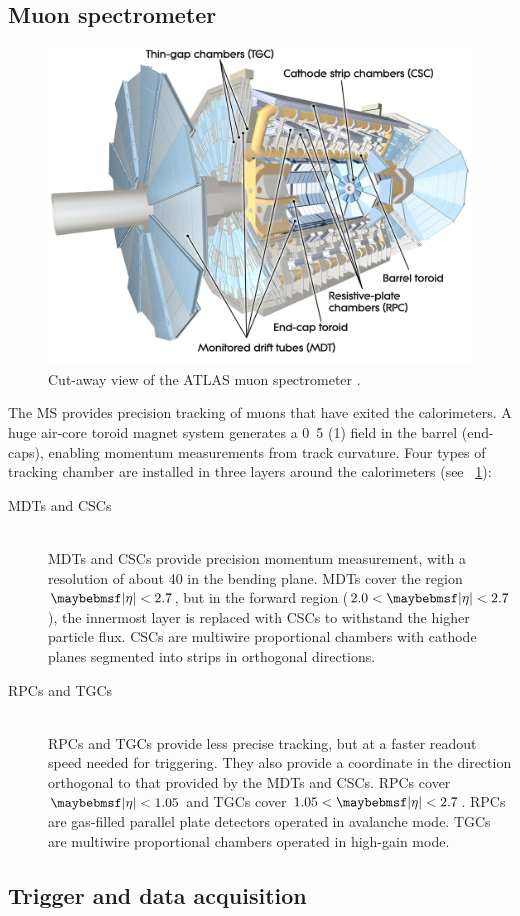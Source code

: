 \subsection{Muon spectrometer}

\begin{figure}
	\includegraphics[width=\mediumfigwidth]{tex/experiment/ms_whole}
	\caption{Cut-away view of the ATLAS muon spectrometer \cite{ATLAS-detector}.}
	\label{fig:muon_spectrometer}
\end{figure}

The \ac{MS} provides precision tracking of muons that have exited the calorimeters. A 
huge air-core toroid magnet system generates a \unit{0.5}{\tesla} (\unit{1}{\tesla}) 
field in the barrel (end-caps), enabling momentum measurements from track curvature. Four 
types of tracking chamber are installed in three layers around the calorimeters (see 
\Figure~\ref{fig:muon_spectrometer}):
\begin{description}
\item[\acp{MDT} and \acp{CSC}] \hfill \\
	\acp{MDT} and \acp{CSC} provide precision momentum measurement, with a resolution of 
	about \unit{40}{\micro\metre} in the bending plane. \acp{MDT} cover the region 
	$\mods{\eta} < 2.7$, but in the forward region ($2.0 < \mods{\eta} < 2.7$), the 
	innermost layer is replaced with \acp{CSC} to withstand the higher particle flux. 
	\acp{CSC} are multiwire proportional chambers with cathode planes segmented into 
	strips in orthogonal directions.
\item[\acp{RPC} and \acp{TGC}] \hfill \\
	\acp{RPC} and \acp{TGC} provide less precise tracking, but at a faster readout speed 
	needed for triggering. They also provide a coordinate in the direction 
	orthogonal to that provided by the \acp{MDT} and \acp{CSC}. \acp{RPC} cover 
	$\mods{\eta} < 1.05$ and \acp{TGC} cover $1.05 < \mods{\eta} < 2.7$.
	\acp{RPC} are gas-filled parallel plate detectors operated in avalanche mode.
	\acp{TGC} are multiwire proportional chambers operated in high-gain mode.
\end{description}

\subsection{Trigger and data acquisition}

